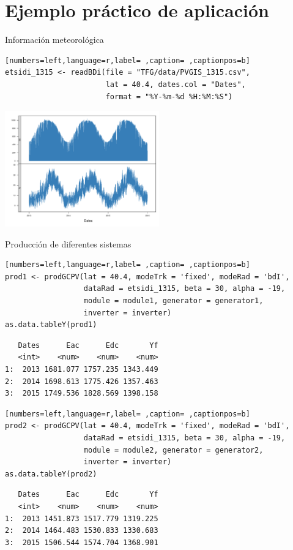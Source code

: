 \documentclass[aspectratio=169, usenames,svgnames,dvipsnames]{beamer}
\begin{document}
\section{Ejemplo práctico de aplicación}
\label{sec:org90e3e00}
\begin{frame}[label={sec:orgd616c8c},fragile]{Información meteorológica}
 \begin{lstlisting}[numbers=left,language=r,label= ,caption= ,captionpos=b]
etsidi_1315 <- readBDi(file = "TFG/data/PVGIS_1315.csv",
                       lat = 40.4, dates.col = "Dates",
                       format = "%Y-%m-%d %H:%M:%S")
\end{lstlisting}

\begin{center}
\includegraphics[width=0.5\textwidth]{../figuras/ejemplos3.pdf}
\end{center}
\end{frame}
\begin{frame}[label={sec:orgc03f028},fragile]{Producción de diferentes sistemas}
 \begin{lstlisting}[numbers=left,language=r,label= ,caption= ,captionpos=b]
prod1 <- prodGCPV(lat = 40.4, modeTrk = 'fixed', modeRad = 'bdI',
                  dataRad = etsidi_1315, beta = 30, alpha = -19,
                  module = module1, generator = generator1,
                  inverter = inverter)
as.data.tableY(prod1)
\end{lstlisting}

\begin{verbatim}
   Dates      Eac      Edc       Yf
   <int>    <num>    <num>    <num>
1:  2013 1681.077 1757.235 1343.449
2:  2014 1698.613 1775.426 1357.463
3:  2015 1749.536 1828.569 1398.158
\end{verbatim}


\begin{lstlisting}[numbers=left,language=r,label= ,caption= ,captionpos=b]
prod2 <- prodGCPV(lat = 40.4, modeTrk = 'fixed', modeRad = 'bdI',
                  dataRad = etsidi_1315, beta = 30, alpha = -19,
                  module = module2, generator = generator2,
                  inverter = inverter)
as.data.tableY(prod2)
\end{lstlisting}

\begin{verbatim}
   Dates      Eac      Edc       Yf
   <int>    <num>    <num>    <num>
1:  2013 1451.873 1517.779 1319.225
2:  2014 1464.483 1530.833 1330.683
3:  2015 1506.544 1574.704 1368.901
\end{verbatim}
\end{frame}
\end{document}
